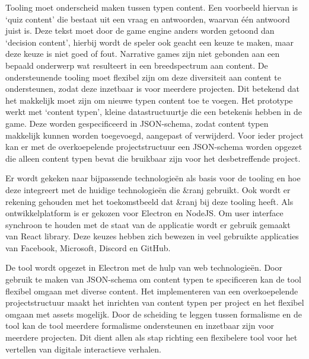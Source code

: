 Tooling moet onderscheid maken tussen typen content. Een voorbeeld hiervan is ‘quiz content’ die bestaat uit een vraag en antwoorden, waarvan één antwoord juist is. Deze tekst moet door de game engine anders worden getoond dan ‘decision content’, hierbij wordt de speler ook geacht een keuze te maken, maar deze keuze is niet goed of fout. Narrative games zijn niet gebonden aan een bepaald onderwerp wat resulteert in een breedspectrum aan content. De ondersteunende tooling moet flexibel zijn om deze diversiteit aan content te ondersteunen, zodat deze inzetbaar is voor meerdere projecten. Dit betekend dat het makkelijk moet zijn om nieuwe typen content toe te voegen. Het prototype werkt met ‘content typen’, kleine datastructuurtje die een betekenis hebben in de game. Deze worden gespecificeerd in JSON-schema, zodat content typen makkelijk kunnen worden toegevoegd, aangepast of verwijderd. Voor ieder project kan er met de overkoepelende projectstructuur een JSON-schema worden opgezet die alleen content typen bevat die bruikbaar zijn voor het desbetreffende project.

Er wordt gekeken naar bijpassende technologieën als basis voor de tooling en hoe deze integreert met de huidige technologieën die \&ranj gebruikt. Ook wordt er rekening gehouden met het toekomstbeeld dat \&ranj bij deze tooling heeft. Als ontwikkelplatform is er gekozen voor Electron en NodeJS. Om user interface synchroon te houden met de staat van de applicatie wordt er gebruik gemaakt van React library. Deze keuzes hebben zich bewezen in veel gebruikte applicaties van Facebook, Microsoft, Discord en GitHub.

De tool wordt opgezet in Electron met de hulp van web technologieën. Door gebruik te maken van JSON-schema om content typen te specificeren kan de tool flexibel omgaan met diverse content. Het implementeren van een overkoepelende projectstructuur maakt het inrichten van content typen per project en het flexibel omgaan met assets mogelijk. Door de scheiding te leggen tussen formalisme en de tool kan de tool meerdere formalisme ondersteunen en inzetbaar zijn voor meerdere projecten. Dit dient allen als stap richting een flexibelere tool voor het vertellen van digitale interactieve verhalen.
